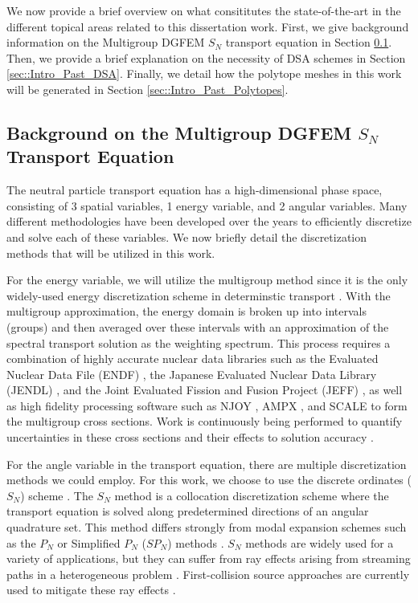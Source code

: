 We now provide a brief overview on what consititutes the state-of-the-art in the different topical areas related to this dissertation work. First, we give background information on the Multigroup DGFEM $S_N$ transport equation in Section \ref{sec::Intro_Past_DGFEMMGSn}. Then, we provide a brief explanation on the necessity of DSA schemes in Section \ref{sec::Intro_Past_DSA}. Finally, we detail how the polytope meshes in this work will be generated in Section \ref{sec::Intro_Past_Polytopes}.

\subsection{Background on the Multigroup DGFEM $S_N$ Transport Equation}
\label{sec::Intro_Past_DGFEMMGSn}

The neutral particle transport equation has a high-dimensional phase space, consisting of 3 spatial variables, 1 energy variable, and 2 angular variables. Many different methodologies have been developed over the years to efficiently discretize and solve each of these variables. We now briefly detail the discretization methods that will be utilized in this work.

For the energy variable, we will utilize the multigroup method since it is the only widely-used energy discretization scheme in determinstic transport \cite{duderstadt1976nuclear,bell1979nuclear}. With the multigroup approximation, the energy domain is broken up into intervals (groups) and then averaged over these intervals with an approximation of the spectral transport solution as the weighting spectrum. This process requires a combination of highly accurate nuclear data libraries such as the Evaluated Nuclear Data File (ENDF) \cite{chadwick2006endf,chadwick2011endf}, the Japanese Evaluated Nuclear Data Library (JENDL) \cite{shibata2002japanese}, and the Joint Evaluated Fission and Fusion Project (JEFF) \cite{koning2006jeff}, as well as high fidelity processing software such as NJOY \cite{macfarlane2002njoy,kahler2012njoy}, AMPX \cite{dunn2002ampx}, and SCALE \cite{bucholz1982scale} to form the multigroup cross sections. Work is continuously being performed to quantify uncertainties in these cross sections and their effects to solution accuracy \cite{aliberti2006nuclear,jessee2008cross}.

For the angle variable in the transport equation, there are multiple discretization methods we could employ. For this work, we choose to use the discrete ordinates ($S_N$) scheme \cite{carlson1968computing,lewis1984computational}. The $S_N$ method is a collocation discretization scheme where the transport equation is solved along predetermined directions of an angular quadrature set. This method differs strongly from modal expansion schemes such as the $P_N$ or Simplified $P_N$ ($SP_N$) methods \cite{bell1979nuclear,gelbard1960application}. $S_N$ methods are widely used for a variety of applications, but they can suffer from ray effects arising from streaming paths in a heterogeneous problem \cite{lathrop1968ray}. First-collision source approaches are currently used to mitigate these ray effects \cite{lathrop1971remedies,morel_rayeffects}.

